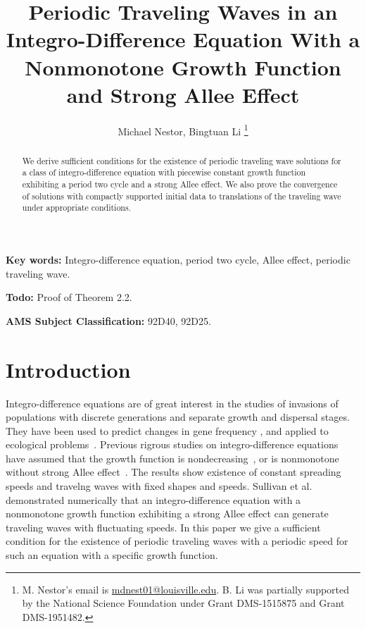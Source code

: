 \documentclass[11pt]{article}
\title{Periodic Traveling Waves in an Integro-Difference Equation With a Nonmonotone Growth Function and Strong Allee Effect}
\author{Michael Nestor, Bingtuan Li
\thanks{M. Nestor's email is \href{mailto:mdnest01@louisville.edu}{mdnest01@louisville.edu}. B. Li was partially supported by the National Science Foundation under Grant DMS-1515875 and Grant DMS-1951482.}}
\affil{Department of Mathematics, University of Louisville, \newline Louisville, KY 40292.}
\theoremstyle{definition}
\numberwithin{equation}{section}
\numberwithin{thm}{section}
\begin{document}
\maketitle


\begin{abstract}
We derive sufficient conditions for the existence of periodic traveling wave solutions for a class of integro-difference equation with piecewise constant growth function exhibiting a period two cycle and a strong Allee effect. We also prove the convergence of solutions with compactly supported initial data to translations of the traveling wave under appropriate conditions. 
\end{abstract}


{\bf Key words:} Integro-difference equation, period two cycle, Allee effect, periodic traveling wave.
\newline

{\bf Todo:} Proof of Theorem 2.2.
\newline

{\bf AMS Subject Classification:} 92D40, 92D25.


\section{Introduction}

Integro-difference equations are of great interest in the studies of invasions of populations with discrete generations and separate growth and dispersal stages. They have been used to predict changes in gene frequency \cite{lui82a, lui82b, lui83, slatkin, w78}, and applied to ecological problems~\cite{hh, ks, kot89, kot92, kotbook, lut, nkl,otto}. Previous rigrous studies on integro-difference equations have assumed that the growth function is nondecreasing~\cite{w78, wein82}, or  is nonmonotone without strong Allee effect~\cite{lui83, wang}. The results show existence of constant spreading speeds and travelng waves with fixed shapes and speeds.   Sullivan et al. ~\cite{pnas} demonstrated numerically  that an integro-difference equation with a nonmonotone growth function exhibiting  a strong Allee effect can generate traveling waves with fluctuating speeds. In this paper we give a sufficient condition for the existence of periodic traveling waves with a periodic speed for such an equation with a specific growth function.
\end{document}
